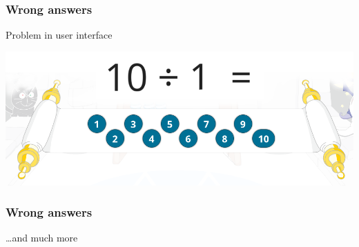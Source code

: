 \documentclass[xcolor=svgnames]{beamer}
\begin{document}
\begin{frame}
    \frametitle{Wrong answers}
    \centering
    \LARGE
    Problem in user interface

    \vfill
    \includegraphics[width=\linewidth]{figures/keyboard.png}
\end{frame}
\begin{frame}
    \frametitle{Wrong answers}
    \centering
    \LARGE
    \dots and much more
\end{frame}
\end{document}
